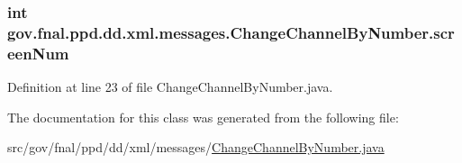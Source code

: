 \hypertarget{classgov_1_1fnal_1_1ppd_1_1dd_1_1xml_1_1messages_1_1ChangeChannelByNumber_afc6e5fa859ed5ddcd9605aa9db8929a6}{
\subsubsection[{screen\-Num}]{\setlength{\rightskip}{0pt plus 5cm}int gov.\-fnal.\-ppd.\-dd.\-xml.\-messages.\-Change\-Channel\-By\-Number.\-screen\-Num\hspace{0.3cm}{\ttfamily [protected]}}}\label{classgov_1_1fnal_1_1ppd_1_1dd_1_1xml_1_1messages_1_1ChangeChannelByNumber_afc6e5fa859ed5ddcd9605aa9db8929a6}


Definition at line 23 of file Change\-Channel\-By\-Number.\-java.



The documentation for this class was generated from the following file\-:\begin{DoxyCompactItemize}
\item 
src/gov/fnal/ppd/dd/xml/messages/\hyperlink{ChangeChannelByNumber_8java}{Change\-Channel\-By\-Number.\-java}\end{DoxyCompactItemize}
